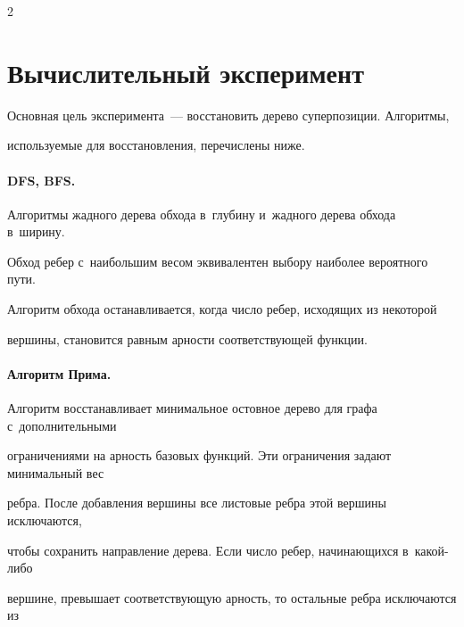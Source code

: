 \begin{multicols}{2}
\vspace*{-9pt}



\section{Вычислительный эксперимент}



\vspace*{-3pt}



Основная цель эксперимента~--- восстановить дерево суперпозиции. Алгоритмы, 

используемые для восстановления, перечислены ниже.



\vspace*{-12pt}



\paragraph*{DFS, BFS.}

Алгоритмы жадного дерева обхода в~глубину и~жадного дерева обхода в~ширину. 

Обход ребер с~наибольшим весом эквивалентен выбору наиболее вероятного пути. 

Алгоритм обхода останавливается, когда число ребер, исходящих из некоторой 

вершины, становится равным арности соответствующей функции.



\vspace*{-12pt}



\paragraph*{Алгоритм Прима.}

Алгоритм восстанавливает минимальное остовное дерево для графа с~дополнительными 

ограничениями на арность базовых функций. Эти ограничения задают минимальный вес 

ребра. После добавления вершины все листовые ребра этой вершины исключаются, 

чтобы сохранить направление дерева. Если число ребер, начинающихся в~какой-либо 

вершине, превышает соответствующую арность, то остальные ребра исключаются из 


\end{multicols}
